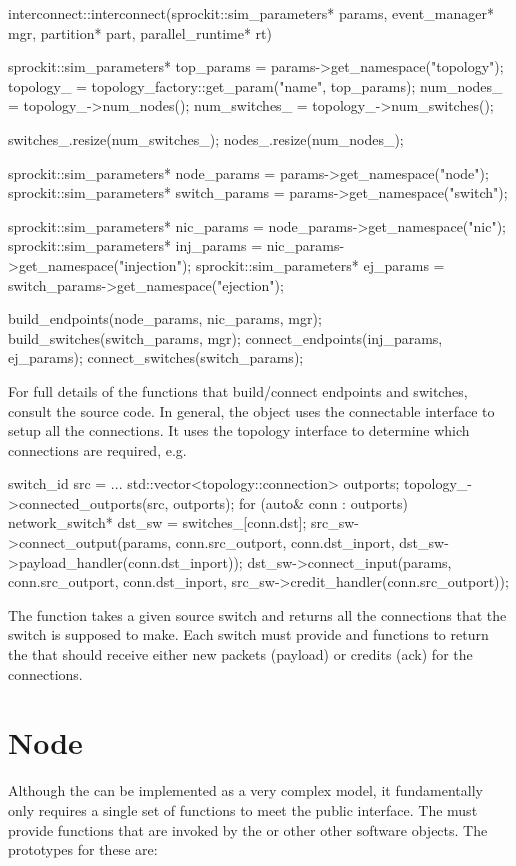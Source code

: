 \begin{CppCode}
interconnect::interconnect(sprockit::sim_parameters* params, event_manager* mgr, 
	partition* part, parallel_runtime* rt)
{
  sprockit::sim_parameters* top_params = params->get_namespace("topology");
  topology_ = topology_factory::get_param("name", top_params);
  num_nodes_ = topology_->num_nodes();
  num_switches_ = topology_->num_switches();
  
  switches_.resize(num_switches_);
  nodes_.resize(num_nodes_);

  sprockit::sim_parameters* node_params = params->get_namespace("node");
  sprockit::sim_parameters* switch_params = params->get_namespace("switch");
  
  sprockit::sim_parameters* nic_params = node_params->get_namespace("nic");
  sprockit::sim_parameters* inj_params = nic_params->get_namespace("injection");
  sprockit::sim_parameters* ej_params = switch_params->get_namespace("ejection"); 
  
  build_endpoints(node_params, nic_params, mgr);
  build_switches(switch_params, mgr);
  connect_endpoints(inj_params, ej_params);
  connect_switches(switch_params); 
}
\end{CppCode}

For full details of the functions that build/connect endpoints and switches, consult the source code.
In general, the  object uses the connectable interface to setup all the connections.
It uses the topology interface to determine which connections are required, e.g.

\begin{CppCode}
switch_id src = ...
std::vector<topology::connection> outports;
topology_->connected_outports(src, outports);
for (auto& conn : outports){
  network_switch* dst_sw = switches_[conn.dst];
  src_sw->connect_output(params, conn.src_outport, conn.dst_inport,
  					 dst_sw->payload_handler(conn.dst_inport));
  dst_sw->connect_input(params, conn.src_outport, conn.dst_inport,
  				       src_sw->credit_handler(conn.src_outport));
}
\end{CppCode}
The  function takes a given source switch and returns all the connections that the
switch is supposed to make.  Each switch must provide  and  functions to return
the  that should receive either new packets (payload) or credits (ack) for the connections.

\section{Node}\label{sec:node}
Although the \nodecls can be implemented as a very complex model, it fundamentally only requires a single set of functions to meet the public interface.
The \nodecls must provide  functions that are invoked by the  or other other software objects.
The prototypes for these are:


